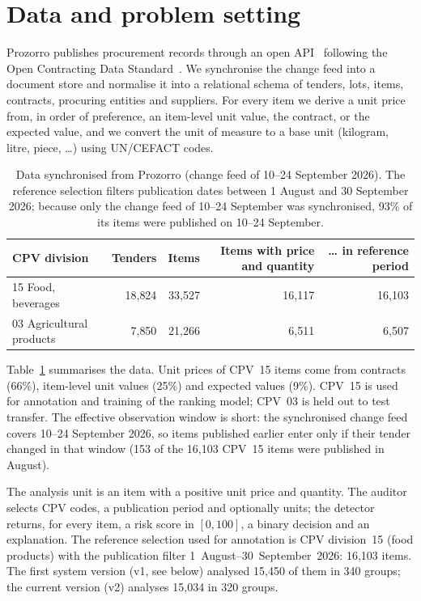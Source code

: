 \documentclass[conference]{IEEEtran}
\begin{document}
\section{Data and problem setting}\label{sec:data}

Prozorro publishes procurement records through an open API~\cite{prozorroapi} following the Open
Contracting Data Standard~\cite{ocds}. We synchronise the change feed into a document store and normalise
it into a relational schema of tenders, lots, items, contracts, procuring entities and suppliers. For every
item we derive a unit price from, in order of preference, an item-level unit value, the contract, or the
expected value, and we convert the unit of measure to a base unit (kilogram, litre, piece, \ldots) using
UN/CEFACT codes.

\begin{table}[t]
\centering
\caption{Data synchronised from Prozorro (change feed of 10--24 September 2026). The reference selection
filters publication dates between 1 August and 30 September 2026; because only the change feed of
10--24 September was synchronised, 93\% of its items were published on 10--24 September.}
\label{tab:data}
\small
\begin{tabular}{lrrrr}
\toprule
CPV division & Tenders & Items & Items with price and quantity & \ldots{} in reference period \\
\midrule
15 Food, beverages & 18{,}824 & 33{,}527 & 16{,}117 & 16{,}103 \\
03 Agricultural products & 7{,}850 & 21{,}266 & 6{,}511 & 6{,}507 \\
\bottomrule
\end{tabular}
\end{table}
Table~\ref{tab:data} summarises the data. Unit prices of CPV~15 items come from contracts (66\%),
item-level unit values (25\%) and expected values (9\%). CPV~15 is used for annotation and training of the
ranking model; CPV~03 is held out to test transfer. The effective observation window is short: the
synchronised change feed covers 10--24 September 2026, so items published earlier enter only if their
tender changed in that window (153 of the 16{,}103 CPV~15 items were published in August).

The analysis unit is an item with a positive unit price and quantity. The auditor selects CPV codes, a
publication period and optionally units; the detector returns, for every item, a risk score in $[0,100]$,
a binary decision and an explanation. The reference selection used for annotation is CPV division~15
(food products) with the publication filter 1~August--30~September~2026: 16{,}103 items. The first system
version (v1, see below) analysed 15{,}450 of them in 340 groups; the current version (v2) analyses 15{,}034
in 320 groups.
\end{document}
